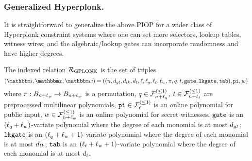 \subsubsection*{Generalized Hyperplonk.}
It is straightforward to generalize the above PIOP for a wider class of Hyperplonk constraint systems 
where one can set more selectors, lookup tables, witness wires; and the algebraic/lookup gates can 
incorporate randomness and have higher degrees.

\begin{definition}
    The indexed relation ${\mathcal{R}}_{\text{GPLONK}}$ is the set of triples 
    \[
        (\idxR, \instR, \witR) = 
            ((n, \dgate, \dlk, \dtab, 
              \ell, \lsel, \ltab, \lwit, 
              \perm, \sel, \tabp, 
              \gatep, \lgatep, \ltabp), 
            \pubinp, 
            \witp)
    \]
    where $\pi : B_{n+\ell_w} \rightarrow B_{n+\ell_w}$
    is a permutation, $q \in {\mathcal{F}}_{n+\ell_q}^{(\le{1})}$, $t \in {\mathcal{F}}_{n+\ell_t}^{(\le{1})}$ are preprocessed 
    multilinear polynomials, $\mathtt{pi} \in {\mathcal{F}}_{\ell}^{(\le{1})}$ is an 
    online polynomial for public input, $w \in {\mathcal{F}}_{n+\ell_w}^{(\le{1})}$
    is an online polynomial for secret witnesses. 
    $\mathtt{gate}$ is an $(\ell_q+\ell_w)$-variate polynomial where the degree of each monomial
    is at most $d_{gt}$;
    $\mathtt{lkgate}$ is an $(\ell_q+\ell_w+1)$-variate polynomial where the degree of each monomial
    is at most $d_{lk}$;
    $\mathtt{tab}$ is an $(\ell_t+\ell_w+1)$-variate polynomial where the degree of each monomial 
    is at most $d_t$.
    

\end{definition}
